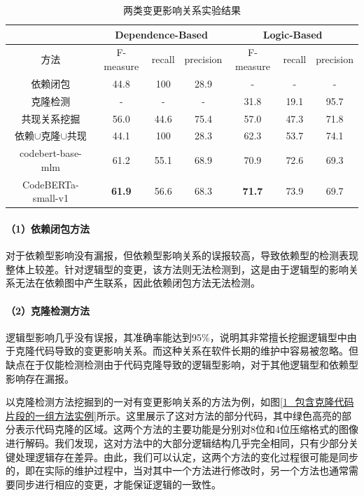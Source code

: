 \begin{table}[htbp]
\caption{两类变更影响关系实验结果}
\label{1_两类变更影响关系实验结果}
\vspace{0.5em}\centering\wuhao
\begin{tabular}{c|ccc|ccc}
\toprule
  & \multicolumn{3}{c|}{Dependence-Based} & \multicolumn{3}{c}{Logic-Based}  \\
\midrule
方法 & F-measure & recall & precision & F-measure & recall & precision  \\
\midrule
依赖闭包 &  44.8 & 100 & 28.9 & - & - & -  \\
克隆检测 &  - & - & - & 31.8 & 19.1 & 95.7 \\
共现关系挖掘 &  56.0 & 44.6 & 75.4 & 57.0 & 47.3 & 71.8 \\
依赖$\cup$克隆$\cup$共现 &  44.1 & 100 & 28.3 & 62.3 & 53.7 & 74.1 \\
codebert-base-mlm &   61.2 & 55.1 & 68.9 & 70.9 & 72.6 & 69.3 \\
CodeBERTa-small-v1 &   \textbf{61.9} & 56.6 & 68.3 & \textbf{71.7} & 73.9 & 69.7 \\
\bottomrule
\end{tabular}
\end{table}


\paragraph{（1）依赖闭包方法} 对于依赖型影响没有漏报，但依赖型影响关系的误报较高，导致依赖型的检测表现整体上较差。针对逻辑型的变更，该方法则无法检测到，这是由于逻辑型的影响关系无法在依赖图中产生联系，因此依赖闭包方法无法检测。
    
\paragraph{（2）克隆检测方法} 逻辑型影响几乎没有误报，其准确率能达到95\%，说明其非常擅长挖掘逻辑型中由于克隆代码导致的变更影响关系。而这种关系在软件长期的维护中容易被忽略。但缺点在于仅能检测检测由于代码克隆导致的逻辑型影响，对于其他逻辑型和依赖型影响存在漏报。
    
以克隆检测方法挖掘到的一对有变更影响关系的方法为例，如图\ref{1_包含克隆代码片段的一组方法实例}所示。这里展示了这对方法的部分代码，其中绿色高亮的部分表示代码克隆的区域。这两个方法的主要功能是分别对8位和4位压缩格式的图像进行解码。我们发现，这对方法中的大部分逻辑结构几乎完全相同，只有少部分关键处理逻辑存在差异。由此，我们可以认定，这两个方法的变化过程很可能是同步的，即在实际的维护过程中，当对其中一个方法进行修改时，另一个方法也通常需要同步进行相应的变更，才能保证逻辑的一致性。

